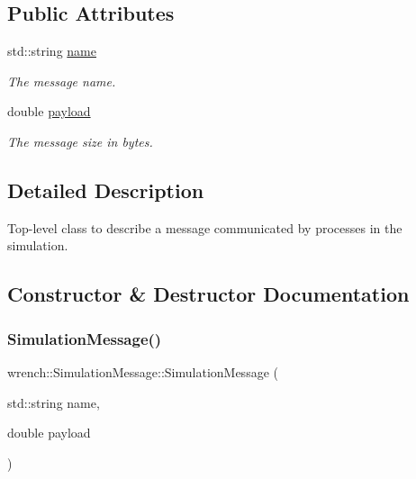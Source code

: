 \subsection*{Public Attributes}
\begin{DoxyCompactItemize}
\item 
\mbox{\label{classwrench_1_1_simulation_message_ab224f6dd8ec5ee2e7f65bfcdf2b8a86b}} 
std\+::string \hyperlink{classwrench_1_1_simulation_message_ab224f6dd8ec5ee2e7f65bfcdf2b8a86b}{name}
\begin{DoxyCompactList}\small\item\em The message name. \end{DoxyCompactList}\item 
\mbox{\label{classwrench_1_1_simulation_message_a914f2732713f7c02898e66f05a7cb8a1}} 
double \hyperlink{classwrench_1_1_simulation_message_a914f2732713f7c02898e66f05a7cb8a1}{payload}
\begin{DoxyCompactList}\small\item\em The message size in bytes. \end{DoxyCompactList}\end{DoxyCompactItemize}


\subsection{Detailed Description}
Top-\/level class to describe a message communicated by processes in the simulation. 

\subsection{Constructor \& Destructor Documentation}
\mbox{\label{classwrench_1_1_simulation_message_af5fbc8bd2864ceb9cdb2dc70c6e916c6}} 
\subsubsection{\texorpdfstring{Simulation\+Message()}{SimulationMessage()}}
{\footnotesize\ttfamily wrench\+::\+Simulation\+Message\+::\+Simulation\+Message (\begin{DoxyParamCaption}\item[{std\+::string}]{name,  }\item[{double}]{payload }\end{DoxyParamCaption})}




